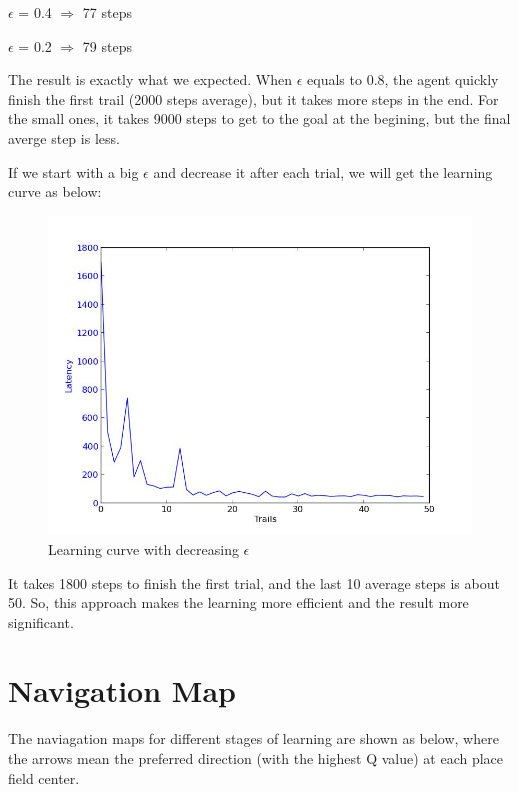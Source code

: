 \documentclass[a4paper, 11pt]{article}
\begin{document}
$\epsilon$ = 0.4 $\Rightarrow$ 77  steps

$\epsilon$ = 0.2 $\Rightarrow$ 79 steps

The result is exactly what we expected. When $\epsilon$ equals to 0.8, the agent quickly finish the first trail (2000 steps average), but it takes more steps in the end. For the small ones, it takes 9000 steps to get to the goal at the begining, but the final averge step is less.

If we start with a big $\epsilon$ and decrease it after each trial, we will get the learning curve as below:

\begin{figure}[h]
\centering
\includegraphics[scale=0.35]{../figure/decEps.jpeg}
\caption{Learning curve with decreasing $\epsilon$}
\end{figure}


It takes 1800 steps to finish the first trial, and the last 10 average steps is about 50. So, this approach makes the learning more efficient and the result more significant.

\section{Navigation Map}

The naviagation maps for different stages of learning are shown as below, where the arrows mean the preferred direction (with the highest Q value) at each place field center.
\end{document}
